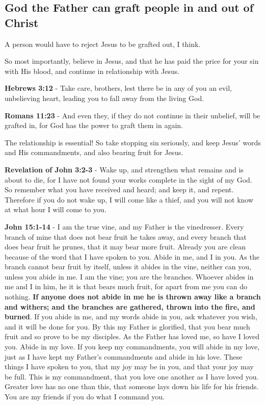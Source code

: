 \documentclass[11pt]{article}
\begin{document}
\subsection{God the Father can graft people in and out of Christ}
\label{sec:orgb3f5f2c}
A person would have to reject Jesus to be grafted out, I think.

So most importantly, believe in Jesus, and that he has paid the price for your sin with His blood, and continue in relationship with Jesus.

\textbf{Hebrews 3:12} - Take care, brothers, lest there be in any of you an evil, unbelieving heart, leading you to fall away from the living God.

\textbf{Romans 11:23} - And even they, if they do not continue in their unbelief, will be grafted in, for God has the power to graft them in again.

The relationship is essential!
So take stopping sin seriously, and keep Jesus' words and His commandments, and also bearing fruit for Jesus.

\textbf{Revelation of John 3:2-3} - Wake up, and strengthen what remains and is about to die, for I have not found your works complete in the sight of my God. So remember what you have received and heard; and keep it, and repent. Therefore if you do not wake up, I will come like a thief, and you will not know at what hour I will come to you.

\textbf{John 15:1-14} - I am the true vine, and my Father is the vinedresser. Every branch of mine that does not bear fruit he takes away, and every branch that does bear fruit he prunes, that it may bear more fruit. Already you are clean because of the word that I have spoken to you. Abide in me, and I in you. As the branch cannot bear fruit by itself, unless it abides in the vine, neither can you, unless you abide in me. I am the vine; you are the branches. Whoever abides in me and I in him, he it is that bears much fruit, for apart from me you can do nothing. \textbf{If anyone does not abide in me he is thrown away like a branch and withers; and the branches are gathered, thrown into the fire, and burned}. If you abide in me, and my words abide in you, ask whatever you wish, and it will be done for you. By this my Father is glorified, that you bear much fruit and so prove to be my disciples. As the Father has loved me, so have I loved you. Abide in my love. If you keep my commandments, you will abide in my love, just as I have kept my Father's commandments and abide in his love. These things I have spoken to you, that my joy may be in you, and that your joy may be full. This is my commandment, that you love one another as I have loved you. Greater love has no one than this, that someone lays down his life for his friends. You are my friends if you do what I command you.
\end{document}
